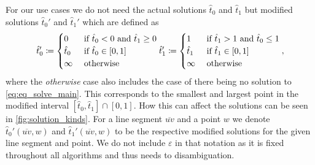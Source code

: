 For our use cases we do not need the actual solutions \(\hat{t}_0\) and \(\hat{t}_1\) but modified solutions \(\hat{t}_0'\) and \(\hat{t}_1'\) which are defined as 
\begin{equation}
  \hat{t}_0' \coloneq \begin{cases}
    0 & \textrm{ if } \hat{t}_0 < 0 \textrm{ and } \hat{t}_1 \geq 0\\
    \hat{t}_0 & \textrm{ if } \hat{t}_0 \in [0, 1]\\
    \infty &\textrm{ otherwise }
  \end{cases}\\
  \hat{t}_1' \coloneq \begin{cases}
    1 & \textrm{ if } \hat{t}_1 > 1 \textrm{ and } \hat{t}_0 \leq 1\\
    \hat{t}_1 & \textrm{ if } \hat{t}_1 \in [0, 1]\\
    \infty &\textrm{ otherwise }
  \end{cases},
\end{equation}
where the \emph{otherwise} case also includes the case of there being no solution to \cref{eq:eq_solve_main}. This corresponds to the smallest and largest point in the modified interval \([\hat t_0, \hat t_1] \cap [0, 1]\). How this can affect the solutions can be seen in \cref{fig:solution_kinds}.
For a line segment \(\overline{uv}\) and a point \(w\) we denote \(\hat t_0'(\overline{uv}, w)\) and \(\hat t_1'(\overline{uv}, w)\) to be the respective modified solutions for the given line segment and point. We do not include \(\varepsilon\) in that notation as it is fixed throughout all algorithms and thus needs to disambiguation.

